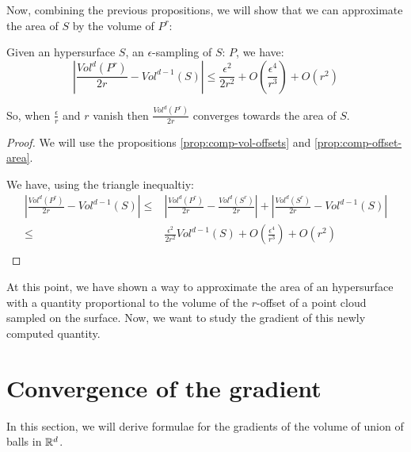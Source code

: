Now, combining the previous propositions, we will show that we can approximate
the area of $ S $ by the volume of $ P^r $:

\begin{proposition}
    \label{prop:approx-volume-area}
    Given an hypersurface $ S $, an $\epsilon$-sampling of $ S $: $ P $, we
    have:
    $$ | \frac{Vol^d(P^r)}{2r} - Vol^{d-1}(S) | \leq \frac{\epsilon^2}{2r^2} +
    O(\frac{\epsilon^4}{r^3}) + O(r^2) $$

    So, when $ \frac{\epsilon}{r} $ and $ r $ vanish then $
    \frac{Vol^d(P^r)}{2r} $ converges towards the area of $ S $.
\end{proposition}

\begin{proof}
    We will use the propositions \ref{prop:comp-vol-offsets} and
    \ref{prop:comp-offset-area}.

    We have, using the triangle inequaltiy:
    \begin{align*}
        \left| \frac{Vol^d(P^r)}{2r} - Vol^{d-1}(S) \right| \leq& \left| \frac{Vol^d(P^r)}{2r} -
            \frac{Vol^d(S^r)}{2r} \right| + \left| \frac{Vol^d(S^r)}{2r} -
            Vol^{d-1}(S) \right| \\
        \leq& \frac{\epsilon^2}{2r^2} Vol^{d-1}(S) + O(\frac{\epsilon^4}{r^3}) + O(r^2) \\
    \end{align*}
\end{proof}

At this point, we have shown a way to approximate the area of an hypersurface
with a quantity proportional to the volume of the $r$-offset of a point cloud
sampled on the surface.
Now, we want to study the gradient of this newly computed quantity.


\section{Convergence of the gradient}

In this section, we will derive formulae for the gradients of the volume of
union of balls in $ \mathbb{R}^d $.

